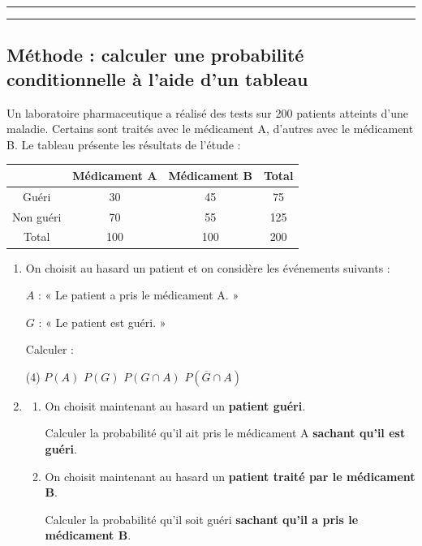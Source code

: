 \documentclass{article}
\theoremstyle{definition}
\begin{document}
\vfill

\vspace{0.5em}
\hrule
\vspace{0.5em}

\setcounter{exercice}{0}
{
  \normalsize
  \textbf{\Niveau} \hfill \textbf{\ChapitreCourt} \hfill \textbf{\Document}
}
\vspace{0.5em}
\hrule

\vfill

\subsection*{Méthode : calculer une probabilité conditionnelle à l'aide d'un tableau}

\noindent

Un laboratoire pharmaceutique a réalisé des tests sur 200 patients atteints d'une maladie.
Certains sont traités avec le médicament A, d'autres avec le médicament B.
Le tableau présente les résultats de l'étude :

\begin{center}
\renewcommand{\arraystretch}{1.5}
\begin{tabular}{|c|c|c|c|}
\hline
 & Médicament A & Médicament B & Total \\
\hline
Guéri & 30 & 45 & 75 \\
\hline
Non guéri & 70 & 55 & 125 \\
\hline
Total & 100 & 100 & 200 \\
\hline
\end{tabular}
\end{center}

\begin{enumerate}
    \item On choisit au hasard un patient et on considère les événements suivants :

    $A$ : « Le patient a pris le médicament A. »

    $G$ : « Le patient est guéri. »

    Calculer :
    \begin{tasks}(4)
        \task $P(A)$
        \task $P(G)$
        \task $P(G \cap A)$
        \task $P(\overline{G} \cap A)$
    \end{tasks}

    \item
    \begin{enumerate}
        \item On choisit maintenant au hasard un \textbf{patient guéri}.
        
        Calculer la probabilité qu'il ait pris le médicament A \textbf{sachant qu'il est guéri}.

        \item On choisit maintenant au hasard un \textbf{patient traité par le médicament B}.
        
        Calculer la probabilité qu'il soit guéri \textbf{sachant qu'il a pris le médicament B}.
    \end{enumerate}
\end{enumerate}
\end{document}
